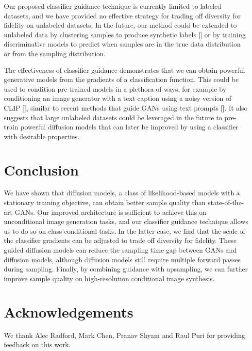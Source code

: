 \documentclass{article}
\newcommand{\shortcite}[1]{[\citenum{#1}]}
\begin{document}
Our proposed classifier guidance technique is currently limited to labeled datasets, and we have provided no effective strategy for trading off diversity for fidelity on unlabeled datasets. In the future, our method could be extended to unlabeled data by clustering samples to produce synthetic labels \shortcite{unlabeledgan} or by training discriminative models to predict when samples are in the true data distribution or from the sampling distribution.

The effectiveness of classifier guidance demonstrates that we can obtain powerful generative models from the gradients of a classification function. This could be used to condition pre-trained models in a plethora of ways, for example by conditioning an image generator with a text caption using a noisy version of CLIP \shortcite{clip}, similar to recent methods that guide GANs using text prompts \shortcite{clipglass,styleclip,bigsleep}. It also suggests that large unlabeled datasets could be leveraged in the future to pre-train powerful diffusion models that can later be improved by using a classifier with desirable properties.

\section{Conclusion}
\label{sec:conclusion}
We have shown that diffusion models, a class of likelihood-based models with a stationary training objective, can obtain better sample quality than state-of-the-art GANs. Our improved architecture is sufficient to achieve this on unconditional image generation tasks, and our classifier guidance technique allows us to do so on class-conditional tasks. In the latter case, we find that the scale of the classifier gradients can be adjusted to trade off diversity for fidelity. These guided diffusion models can reduce the sampling time gap between GANs and diffusion models, although diffusion models still require multiple forward passes during sampling. Finally, by combining guidance with upsampling, we can further improve sample quality on high-resolution conditional image synthesis. 

\section{Acknowledgements}
We thank Alec Radford, Mark Chen, Pranav Shyam and Raul Puri for providing feedback on this work. 



\end{document}
